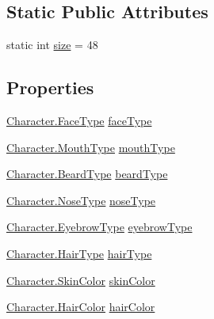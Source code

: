\subsection*{Static Public Attributes}
\begin{DoxyCompactItemize}
\item 
static int \mbox{\hyperlink{class_portrait_ac8488582e058dc2d20b8f2e5bdfbe427}{size}} = 48
\end{DoxyCompactItemize}
\subsection*{Properties}
\begin{DoxyCompactItemize}
\item 
\mbox{\hyperlink{class_character_aae9a74ea017a528536789f545094d628}{Character.\+Face\+Type}} \mbox{\hyperlink{class_portrait_adee621ae3df1fbf3ed96e9262d9e3699}{face\+Type}}
\item 
\mbox{\hyperlink{class_character_aaefb65409260b3ad1511951aab1ddd6c}{Character.\+Mouth\+Type}} \mbox{\hyperlink{class_portrait_a9ce977a3c3a8b9790abfaeb57dd16d78}{mouth\+Type}}
\item 
\mbox{\hyperlink{class_character_afc1fe7f790870a92fe62d3e57296de81}{Character.\+Beard\+Type}} \mbox{\hyperlink{class_portrait_acc7fbe447bbd427f26e0490b868febd3}{beard\+Type}}
\item 
\mbox{\hyperlink{class_character_a638a71f8525dc3a59596f7f4a7836036}{Character.\+Nose\+Type}} \mbox{\hyperlink{class_portrait_a08a64694ad71d1f822acbf63845ae130}{nose\+Type}}
\item 
\mbox{\hyperlink{class_character_a7ba51a2ab6ee02a615df9275665c5e4c}{Character.\+Eyebrow\+Type}} \mbox{\hyperlink{class_portrait_a1a002dfca19c85ae7724a0e3210ca97a}{eyebrow\+Type}}
\item 
\mbox{\hyperlink{class_character_ada39ccb0e0be37a8f8f0e9a864eb5733}{Character.\+Hair\+Type}} \mbox{\hyperlink{class_portrait_a7fbaf07b4f6d0fe0213e4b812fe90acc}{hair\+Type}}
\item 
\mbox{\hyperlink{class_character_a726214a0fe480fffada7772697764824}{Character.\+Skin\+Color}} \mbox{\hyperlink{class_portrait_ac3ed63c9b306564506b4b96867990f84}{skin\+Color}}
\item 
\mbox{\hyperlink{class_character_a7940fffce9bfadb9e7abf15490cf8bb0}{Character.\+Hair\+Color}} \mbox{\hyperlink{class_portrait_a656bde64b3ef49fa317d114d1c3fbe7c}{hair\+Color}}
\end{DoxyCompactItemize}



